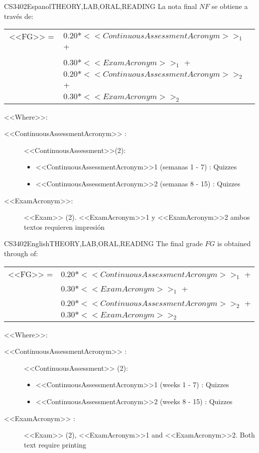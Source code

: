  
  \begin{evaluation}{CS3402}{Espanol}{THEORY,LAB,ORAL,READING}
  La nota final $NF$ se obtiene a través de:

  \begin{tabular}{cl}
   <<FG>> = ~ & $0.20*<<ContinuousAssessmentAcronym>>_{1}$ + \\
              & $0.30*<<ExamAcronym>>_{1}$ + \\
              & $0.20*<<ContinuousAssessmentAcronym>>_{2}$ + \\
              & $0.30*<<ExamAcronym>>_{2}$
  \end{tabular}

  \noindent <<Where>>:
  \begin{description}
      \item[<<ContinuousAssessmentAcronym>> :] <<ContinuousAssessment>>(2):
  \begin{itemize}
             \item  <<ContinuousAssessmentAcronym>>1 (semanas 1 - 7) : Quizzes
              \item <<ContinuousAssessmentAcronym>>2 (semanas 8 - 15) : Quizzes
    \end{itemize}
      \item[<<ExamAcronym>>:] <<Exam>> (2). <<ExamAcronym>>1 y <<ExamAcronym>>2 ambos textos requieren impresión
  \end{description}
  \end{evaluation}
 
  \begin{evaluation}{CS3402}{English}{THEORY,LAB,ORAL,READING}
  The final grade $FG$ is obtained through of:
 
  \begin{tabular}{cl}
      <<FG>> = & $0.20*<<ContinuousAssessmentAcronym>>_{1}$ +\\
               & $0.30*<<ExamAcronym>>_{1}$ +\\
               & $0.20*<<ContinuousAssessmentAcronym>>_{2}$ + \\
               & $0.30*<<ExamAcronym>>_{2}$
  \end{tabular}

  \noindent <<Where>>:
  \begin{description}
      \item[<<ContinuousAssessmentAcronym>> :] <<ContinuousAssessment>> (2):
            \begin{itemize}
               \item  <<ContinuousAssessmentAcronym>>1 (weeks 1 - 7)  : Quizzes
                \item <<ContinuousAssessmentAcronym>>2 (weeks 8 - 15) : Quizzes
            \end{itemize}
      \item[<<ExamAcronym>> :] <<Exam>> (2), <<ExamAcronym>>1 and <<ExamAcronym>>2. Both text require printing
  \end{description}
  \end{evaluation}
 

